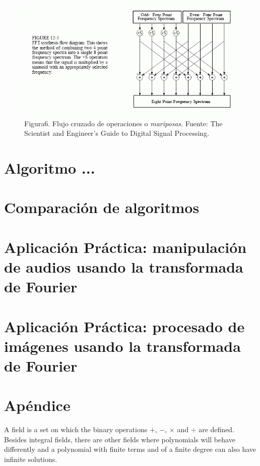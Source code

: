 \documentclass[review,1p]{elsarticle}
\begin{document}
\begin{figure}[!h]
    \centering
    \includegraphics[scale=0.7]{Figuras/F_12_5.png}
    \\
    \small Figura6. Flujo cruzado de operaciones o \textit{mariposas}. Fuente: The Scientist and Engineer's Guide to Digital Signal Processing.\\
\end{figure}


\section{Algoritmo ...}
\section{Comparación de algoritmos}
\section{Aplicación Práctica: manipulación de audios usando la transformada de Fourier}
\section{Aplicación Práctica: procesado de imágenes usando la transformada de Fourier}

\section*{Apéndice}
A field is a set on which the binary operations $+$, $-$, $\times$ and $\div$ are defined.
Besides integral fields, there are other fields where polynomials will behave differently and a polynomial with finite terms and of a finite degree can also have infinite solutions.
\end{document}
